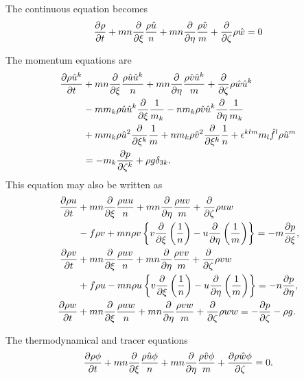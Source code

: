 The continuous equation becomes
\begin{equation}
  \pd{\rho}{t} + mn\pd{}{\xi}\frac{\rho \hat{u}}{n} + mn\pd{}{\eta}\frac{\rho \hat{v}}{m} + \pd{}{\zeta}\rho \hat{w} = 0
\end{equation}

The momentum equations are
\begin{align}
  \pd{\rho\hat{u}^k}{t}
  &+ mn\pd{}{\xi}\frac{\rho \hat{u} \hat{u}^k}{n}
   + mn\pd{}{\eta}\frac{\rho \hat{v} \hat{u}^k}{m}
   + \pd{}{\zeta}\rho \hat{w} \hat{u}^k                     \nonumber \\
  &- m m_k \rho \hat{u} \hat{u}^k \pd{}{\xi}\frac{1}{m_k}
   - n m_k \rho \hat{v} \hat{u}^k \pd{}{\eta}\frac{1}{m_k}  \nonumber \\
  &+ m m_k \rho \hat{u}^2 \pd{}{\xi^k}\frac{1}{m}
   + n m_k \rho \hat{v}^2 \pd{}{\xi^k}\frac{1}{n}
   + \epsilon^{klm} m_l \hat{f}^l \rho \hat{u}^m        \nonumber \\
  &= -m_k \pd{p}{\zeta^k} + \rho g \delta_{3k}.
\end{align}
This equation may also be written as 
\begin{align}
  \pd{\rho u}{t} &+ mn\pd{}{\xi}\frac{\rho uu}{n} + mn\pd{}{\eta}\frac{\rho uv}{m} + \pd{}{\zeta}\rho uw  \nonumber \\
  &- f\rho v
   + mn \rho v\left\{v\pd{}{\xi}\left(\frac{1}{n}\right) - u\pd{}{\eta}\left(\frac{1}{m}\right)\right\}
   = -m\pd{p}{\xi}, \\
  \pd{\rho v}{t} &+ mn\pd{}{\xi}\frac{\rho uv}{n} + mn\pd{}{\eta}\frac{\rho vv}{m} + \pd{}{\zeta}\rho vw \nonumber \\
  &+ f\rho u
   - mn \rho u\left\{v\pd{}{\xi}\left(\frac{1}{n}\right) - u\pd{}{\eta}\left(\frac{1}{m}\right)\right\}
   = -n\pd{p}{\eta}, \\
  \pd{\rho w}{t} &+ mn\pd{}{\xi}\frac{\rho uw}{n} + mn\pd{}{\eta}\frac{\rho vw}{m} + \pd{}{\zeta}\rho ww = -\pd{p}{\zeta} -\rho g.
\end{align}

The thermodynamical and tracer equations
\begin{equation}
  \pd{\rho \phi}{t} + mn\pd{}{\xi}\frac{\rho \hat{u}\phi}{n} + mn\pd{}{\eta}\frac{\rho \hat{v}\phi}{m} + \pd{\rho \hat{w}\phi}{\zeta} = 0.
\end{equation}


%
